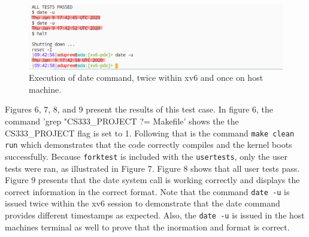 \documentclass[11pt,letterpaper]{report}
\newcommand{\code}[1]{\colorbox{codegray}{\texttt{#1}}}
\begin{document}
{  \begin{figure}[h!]
	\centering
	\includegraphics[width=1\linewidth]{test4-cont3.png}
	\caption[PRINT\_SYSCALLS=0]{Execution of date command, twice within xv6 and once on host machine.}
	\label{fig:P1compileP0-1}
  \end{figure}

\pagebreak

  Figures 6, 7, 8, and 9 present the results of this test case. In figure 6,
  the command 'grep "CS333\_PROJECT ?= Makefile' shows the the CS333\_PROJECT flag is set to 1.
  Following that is the command \code{make clean run} which demonstrates that the code correctly 
  compiles and the kernel boots successfully. Because \code{forktest} is included with 
  the \code{usertests}, only the user tests were ran, as illustrated in Figure 7. Figure 8 shows
  that all user tests pass. Figure 9 presents that the date system call is working correctly and 
  displays the correct information in the correct format. Note that the command \code{date -u} is 
  issued twice within the xv6 session to demonstrate that the date command provides different timestamps
  as expected. Also, the \code{date -u} is issued in the host machines terminal as well to prove 
  that the inormation and format is correct.

\ifdefined \LF
} %
\fi
\end{document}
